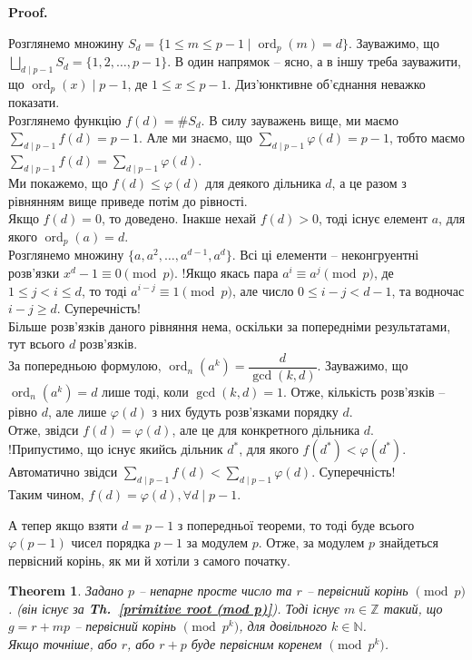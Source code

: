 \documentclass[a4paper, 10pt]{article}
\makeatletter
\theoremstyle{theoremdd}
\newtheorem{theorem}{Theorem}[subsection]
\theoremstyle{theoremdd}
\theoremstyle{theoremdd}
\theoremstyle{theoremdd}
\theoremstyle{theoremdd}
\theoremstyle{theoremdd}
\theoremstyle{theoremdd}
\theoremstyle{theoremdd}
\renewenvironment{proof}[1][Proof.\\]{\par
\pushQED{\hfill \qed}%
\normalfont \topsep6\p@\@plus6\p@\relax
\trivlist
\item\relax
{\bfseries
#1\@addpunct{.}}\hspace\labelsep\ignorespaces
}{%
\popQED\endtrivlist\@endpefalse
}
\DeclareMathOperator{\ord}{ord}
\newcommand\thref[1]{\textbf{Th.~\ref{#1}}}
\makeatother
\begin{document}
\begin{proof}
Розглянемо множину $S_d = \{ 1 \leq m \leq p-1 \mid \ord_p (m) = d \}$. Зауважимо, що $\displaystyle\bigsqcup_{d \mid p-1} S_d = \{1,2,\dots,p-1\}$. В один напрямок -- ясно, а в іншу треба зауважити, що $\ord_p (x) \mid p-1$, де $1 \leq x \leq p-1$. Диз'юнктивне об'єднання неважко показати.\\
Розглянемо функцію $f(d) = \# S_d$. В силу зауважень вище, ми маємо $\displaystyle\sum_{d \mid p-1} f(d) = p-1$. Але ми знаємо, що $\displaystyle\sum_{d \mid p-1} \varphi(d) = p-1$, тобто маємо \\ $\displaystyle\sum_{d \mid p-1} f(d) = \sum_{d \mid p-1} \varphi(d)$.\\
Ми покажемо, що $f(d) \leq \varphi(d)$ для деякого дільника $d$, а це разом з рівнянням вище приведе потім до рівності.\\
Якщо $f(d) = 0$, то доведено. Інакше нехай $f(d) > 0$, тоді існує елемент $a$, для якого $\ord_p (a) = d$.\\
Розглянемо множину $\{a,a^2,\dots,a^{d-1},a^d\}$. Всі ці елементи -- неконгруентні розв'язки $x^d - 1 \equiv 0 \pmod p$. !Якщо якась пара $a^i \equiv a^j \pmod p$, де $1 \leq j < i \leq d$, то тоді $a^{i-j} \equiv 1 \pmod p$, але число $0 \leq i-j < d-1$, та водночас $i-j \geq d$. Суперечність!\\
Більше розв'язків даного рівняння нема, оскільки за попередніми результатами, тут всього $d$ розв'язків.\\
За попередньою формулою, $\ord_n (a^k) = \dfrac{d}{\gcd(k,d)}$. Зауважимо, що \\
$\ord_n (a^k) = d$ лише тоді, коли $\gcd(k,d) = 1$. Отже, кількість розв'язків -- рівно $d$, але лише $\varphi(d)$ з них будуть розв'язками порядку $d$.\\
Отже, звідси $f(d) = \varphi(d)$, але це для конкретного дільника $d$.\\
!Припустимо, що існує якийсь дільник $d^*$, для якого $f(d^*) < \varphi(d^*)$. Автоматично звідси $\displaystyle\sum_{d \mid p-1} f(d) < \sum_{d \mid p-1} \varphi(d)$. Суперечність!\\
Таким чином, $f(d) = \varphi(d), \forall d \mid p-1$.
\end{proof}

А тепер якщо взяти $d = p-1$ з попередньої теореми, то тоді буде всього $\varphi(p-1)$ чисел порядка $p-1$ за модулем $p$. Отже, за модулем $p$ знайдеться первісний корінь, як ми й хотіли з самого початку.

\begin{theorem}
Задано $p$ -- непарне просте число та $r$ -- первісний корінь $\pmod p$. (він існує за \thref{primitive root (mod p)}). Тоді існує $m \in \mathbb{Z}$ такий, що $g = r+mp$ -- первісний корінь $\!\!\pmod {p^k}$, для довільного $k \in \mathbb{N}$.\\
Якщо точніше, або $r$, або $r + p$ буде первісним коренем $\!\! \pmod {p^k}$.
\end{theorem}
\end{document}
